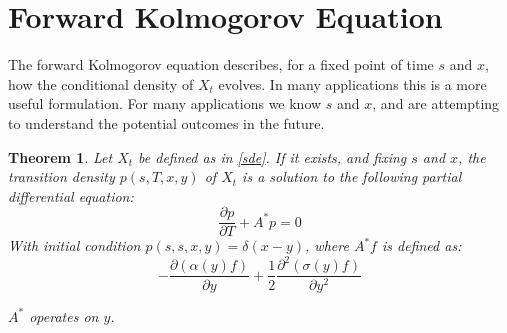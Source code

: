 \documentclass{article}
\newtheorem{theorem}{Theorem}
\theoremstyle{definition}
\begin{document}
\section{Forward Kolmogorov Equation}

The forward Kolmogorov equation describes, for a fixed point of time \(s\) and \(x\), how the conditional density of \(X_t\) evolves.  In many applications this is a more useful formulation.  For many applications we know \(s\) and \(x\), and are attempting to understand the potential outcomes in the future.  

\begin{theorem}\label{fk}
	Let \(X_t\) be defined as in \ref{sde}.  If it exists, and fixing \(s\) and \(x\), the transition density \(p(s, T, x, y)\) of \(X_t\) is a solution to the following partial differential equation:
	\[\frac{\partial p}{\partial T} + A^*p=0 \]
	With initial condition \(p(s, s, x, y)=\delta(x-y)\), where \(A^*f\) is defined as: \[-\frac{\partial \left(\alpha(y) f\right)}{\partial y} + \frac{1}{2}\frac{\partial^2 \left(\sigma(y) f\right) } {\partial y^2}   \]
	
	\(A^*\) operates on \(y\).
\end{theorem}
\end{document}
